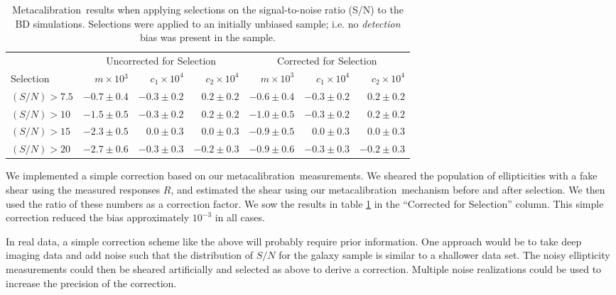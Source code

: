 \documentclass[usegraphicx,usenatbib]{mn2e}
\newcommand{\mcal}{metacalibration}
\newcommand{\Mcal}{Metacalibration}
\newcommand{\mcalR}{$R$}
\begin{document}
\begin{table}
    \centering
    \caption{\Mcal\ results when applying selections on the signal-to-noise ratio (S/N) to the BD simulations. Selections
    were applied to an initially unbiased sample; i.e. no {\em detection}
    bias was present in the sample. \label{tab:selresults}}
    \begin{tabular}{ |l| r|r|r|  r|r|r|}
        \hline
        & \multicolumn{3}{c}{Uncorrected for Selection} & \multicolumn{3}{c}{Corrected for Selection} \\
        Selection & $m \times 10{^3} $ & $c_1 \times 10^4$ & $c_2 \times 10^4$ & $m \times 10^{3}$ & $c_1 \times 10^4$ & $c_2 \times 10^4$ \\
        \hline
        $(S/N) > 7.5$  & $-0.7 \pm 0.4$ & $-0.3 \pm 0.2$ & $0.2 \pm 0.2$ & $-0.6 \pm 0.4$ & $-0.3 \pm 0.2$ & $0.2 \pm 0.2$  \\
        $(S/N) > 10$   & $-1.5 \pm 0.5$ & $-0.3 \pm 0.2$ & $0.2 \pm 0.2$ & $-1.0 \pm 0.5$ & $-0.3 \pm 0.2$ & $0.2 \pm 0.2$  \\
        $(S/N) > 15$   & $-2.3 \pm 0.5$ & $0.0 \pm 0.3$ & $0.0 \pm 0.3$ & $-0.9 \pm 0.5$ & $0.0 \pm 0.3$ & $0.0 \pm 0.3$  \\
        $(S/N) > 20$   & $-2.7 \pm 0.6$ & $-0.3 \pm 0.3$ & $-0.2\pm 0.3$ & $-0.9 \pm 0.6$ & $-0.3 \pm 0.3$ & $-0.2 \pm 0.3$  \\
    \end{tabular}
\end{table}

We implemented a simple correction based on our \mcal\ measurements.  We
sheared the population of ellipticities with a fake shear using the measured
responses \mcalR, and estimated the shear using our \mcal\ mechanism before and
after selection.  We then used the ratio of these numbers as a correction
factor.  We sow the results in table \ref{tab:selresults} in the ``Corrected
for Selection'' column.  This simple correction reduced the bias approximately
$10^{-3}$ in all cases.

In real data, a simple correction scheme like the above will probably require
prior information.  One approach would be to take deep imaging data and add
noise such that the distribution of $S/N$ for the galaxy sample is similar to a
shallower data set.  The noisy ellipticity measurements could then be sheared
artificially and selected as above to derive a correction.  Multiple noise
realizations could be used to increase the precision of the correction.
\end{document}

